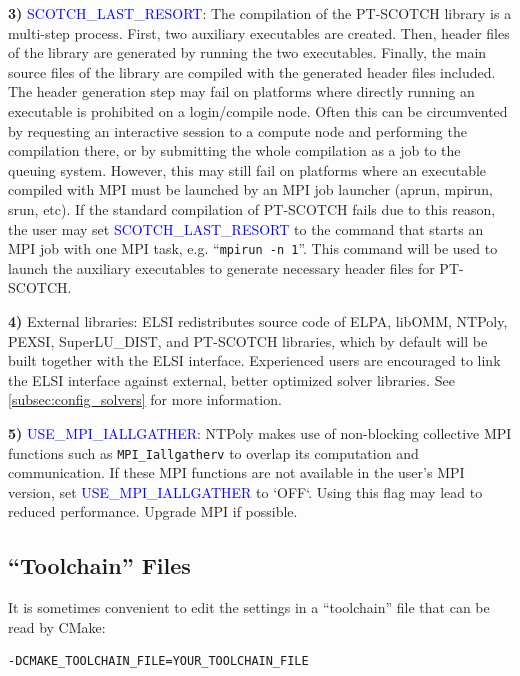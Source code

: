 \documentclass{report}
\begin{document}
\textbf{3)} \textcolor{blue}{SCOTCH\_LAST\_RESORT}:  The compilation of the PT-SCOTCH library is a multi-step process.  First, two auxiliary executables are created.  Then, header files of the library are generated by running the two executables.  Finally, the main source files of the library are compiled with the generated header files included.  The header generation step may fail on platforms where directly running an executable is prohibited on a login/compile node.  Often this can be circumvented by requesting an interactive session to a compute node and performing the compilation there, or by submitting the whole compilation as a job to the queuing system.  However, this may still fail on platforms where an executable compiled with MPI must be launched by an MPI job launcher (aprun, mpirun, srun, etc).  If the standard compilation of PT-SCOTCH fails due to this reason, the user may set \textcolor{blue}{SCOTCH\_LAST\_RESORT} to the command that starts an MPI job with one MPI task, e.g. ``\verb+mpirun -n 1+''.  This command will be used to launch the auxiliary executables to generate necessary header files for PT-SCOTCH.

\textbf{4)} External libraries:  ELSI redistributes source code of ELPA, libOMM, NTPoly, PEXSI, SuperLU\_DIST, and PT-SCOTCH libraries, which by default will be built together with the ELSI interface.  Experienced users are encouraged to link the ELSI interface against external, better optimized solver libraries.  See \ref{subsec:config_solvers} for more information.

\textbf{5)} \textcolor{blue}{USE\_MPI\_IALLGATHER}:  NTPoly makes use of non-blocking collective MPI functions such as \texttt{MPI\_Iallgatherv} to overlap its computation and communication.  If these MPI functions are not available in the user's MPI version, set \textcolor{blue}{USE\_MPI\_IALLGATHER} to `OFF`.  Using this flag may lead to reduced performance.  Upgrade MPI if possible.

\subsection{``Toolchain'' Files}
\label{subsec:config_toolchain}
It is sometimes convenient to edit the settings in a ``toolchain'' file that can be read by CMake:
\begin{tcolorbox}
\begin{verbatim}
-DCMAKE_TOOLCHAIN_FILE=YOUR_TOOLCHAIN_FILE
\end{verbatim}
\end{tcolorbox}
\end{document}
